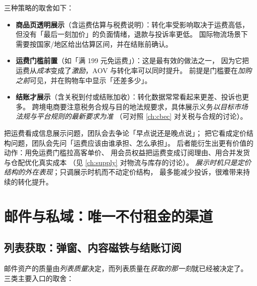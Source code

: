 三种策略的取舍如下：

\begin{itemize}
  \item \textbf{商品页透明展示}（含运费估算与税费说明）：转化率受影响取决于运费高低，
        但没有「最后一刻加价」的负面情绪，退款与投诉率更低。
        国际物流场景下需要按国家/地区给出估算区间，并在结账前确认。
  \item \textbf{运费门槛前置}（如「满 199 元免运费」）：这是最有效的做法之一，
        因为它把运费从\emph{成本}变成了\emph{激励}，AOV 与转化率可以同时提升。
        前提是门槛要在\emph{加购之前}可见，并在购物车中显示「还差多少」。
  \item \textbf{结账才展示}（含关税到付或结账加收）：转化数据常常看起来更差、投诉也更多。
        跨境电商要注意税务合规与目的地法规要求，具体展示义务\emph{以目标市场法规与平台规则的最新要求为准}
        （可对照 \cref{ch:cbec} 对关税与合规的讨论）。
\end{itemize}

\begin{insight}
把运费看成信息展示问题，团队会去争论「早点说还是晚点说」；
把它看成定价结构问题，团队会先问「运费应该由谁承担、怎么承担」。
后者能衍生出更有价值的动作：用免运费门槛拉高客单价、
用会员权益把运费变成订阅理由、用合并发货与仓配优化真实成本
（见 \cref{ch:supply} 对物流与库存的讨论）。
\emph{展示时机只是定价结构的外在表现}；只调展示时机而不动定价结构，
最多能减少投诉，很难带来持续的转化提升。
\end{insight}

\section{邮件与私域：唯一不付租金的渠道}
\label{sec:cro-email}

\subsection{列表获取：弹窗、内容磁铁与结账订阅}

邮件资产的质量由\emph{列表质量}决定，而列表质量在\emph{获取的那一刻}就已经被决定了。
三类主要入口的取舍：

